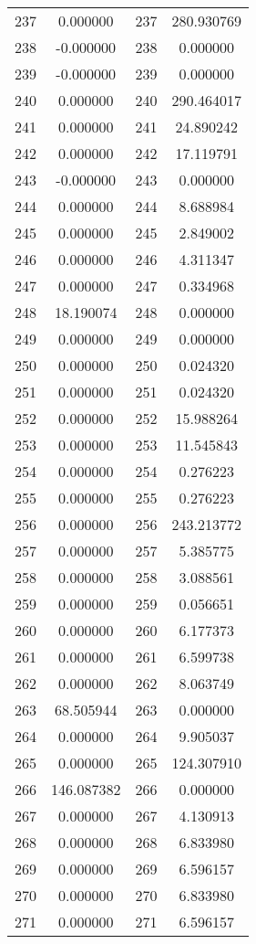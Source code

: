 \documentclass[12pt]{article}
\begin{document}
\begin{longtable}{@{}cccc@{}}
237 & 0.000000 & 237 & 280.930769 \\
238 & -0.000000 & 238 & 0.000000 \\
239 & -0.000000 & 239 & 0.000000 \\
240 & 0.000000 & 240 & 290.464017 \\
241 & 0.000000 & 241 & 24.890242 \\
242 & 0.000000 & 242 & 17.119791 \\
243 & -0.000000 & 243 & 0.000000 \\
244 & 0.000000 & 244 & 8.688984 \\
245 & 0.000000 & 245 & 2.849002 \\
246 & 0.000000 & 246 & 4.311347 \\
247 & 0.000000 & 247 & 0.334968 \\
248 & 18.190074 & 248 & 0.000000 \\
249 & 0.000000 & 249 & 0.000000 \\
250 & 0.000000 & 250 & 0.024320 \\
251 & 0.000000 & 251 & 0.024320 \\
252 & 0.000000 & 252 & 15.988264 \\
253 & 0.000000 & 253 & 11.545843 \\
254 & 0.000000 & 254 & 0.276223 \\
255 & 0.000000 & 255 & 0.276223 \\
256 & 0.000000 & 256 & 243.213772 \\
257 & 0.000000 & 257 & 5.385775 \\
258 & 0.000000 & 258 & 3.088561 \\
259 & 0.000000 & 259 & 0.056651 \\
260 & 0.000000 & 260 & 6.177373 \\
261 & 0.000000 & 261 & 6.599738 \\
262 & 0.000000 & 262 & 8.063749 \\
263 & 68.505944 & 263 & 0.000000 \\
264 & 0.000000 & 264 & 9.905037 \\
265 & 0.000000 & 265 & 124.307910 \\
266 & 146.087382 & 266 & 0.000000 \\
267 & 0.000000 & 267 & 4.130913 \\
268 & 0.000000 & 268 & 6.833980 \\
269 & 0.000000 & 269 & 6.596157 \\
270 & 0.000000 & 270 & 6.833980 \\
271 & 0.000000 & 271 & 6.596157 \\

\end{longtable}
\end{document}

